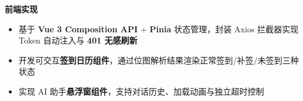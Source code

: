 \documentclass[a4paper,11pt]{article}
\newcommand{\moduleheader}[1]{%
  \vspace{0.4em}
  {\bfseries\sffamily\color{accent} #1}
  \vspace{0.1em}
}
\newcommand{\keyword}[1]{\textbf{#1}}
\begin{document}
\moduleheader{前端实现}

\begin{itemize}[leftmargin=1.5em, itemsep=2pt, parsep=0pt]
  \item 基于 \keyword{Vue 3 Composition API} + \keyword{Pinia} 状态管理，封装 Axios 拦截器实现 Token 自动注入与 \keyword{401 无感刷新}

  \item 开发可交互\keyword{签到日历组件}，通过位图解析结果渲染正常签到/补签/未签到三种状态

  \item 实现 AI 助手\keyword{悬浮窗组件}，支持对话历史、加载动画与独立超时控制
\end{itemize}
\end{document}
